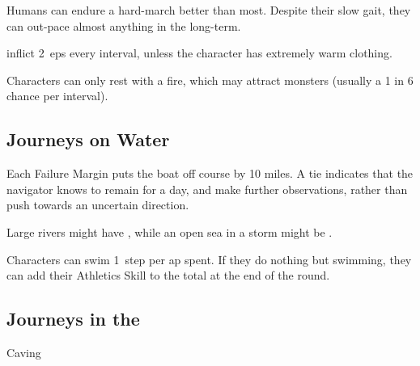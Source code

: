 \begin{multicols}{2}
Humans can endure a hard-march better than most.
Despite their slow gait, they can out-pace almost anything in the long-term.%

%
%
inflict 2~\glspl{ep} every \gls{interval}, unless the character has extremely warm clothing.

Characters can only rest with a fire, which may attract \glspl{monster} (usually a 1 in 6 chance per \gls{interval}).

\pagebreak
\subsection{Journeys on Water}


Each Failure Margin puts the boat off course by 10 miles.
A tie indicates that the navigator knows to remain for a day, and make further observations, rather than push towards an uncertain direction.

Large rivers might have \tn[8], while an open sea in a storm might be \tn[12].

Characters can swim 1~\gls{step} per \gls{ap} spent.
If they do nothing but swimming, they can add their Athletics Skill to the total at the end of the round.

\subsection{Journeys in the }
Caving 

\subsubsection{}

\subsubsection{}


\end{multicols}
